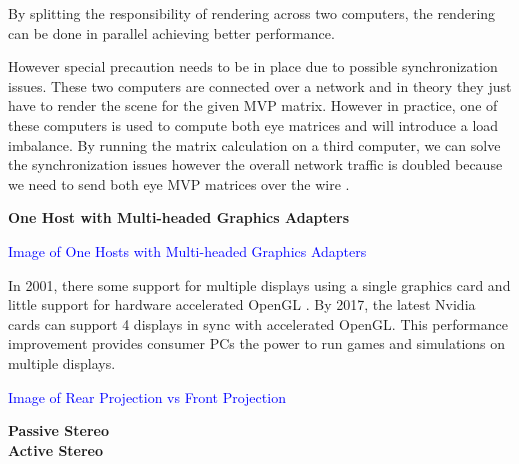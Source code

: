 By splitting the responsibility of rendering across two computers, the rendering can be done in parallel achieving better performance. 

However special precaution needs to be in place due to possible synchronization issues. These two computers are connected over a network and in theory they just have to render the scene for the given MVP matrix. However in practice, one of these computers is used to compute both eye matrices and will introduce a load imbalance. By running the matrix calculation on a third computer, we can solve the synchronization issues however the overall network traffic is doubled because we need to send both eye MVP matrices over the wire \cite{belleman}.

\filbreak
\noindent\textbf{One Host with Multi-headed Graphics Adapters}\\
\begin{center}
	\textcolor{blue}{Image of One Hosts with Multi-headed Graphics Adapters}
\end{center}

In 2001, there some support for multiple displays using a single graphics card and little support for hardware accelerated OpenGL \cite{belleman}.  By 2017, the latest Nvidia cards can support 4 displays in sync with accelerated OpenGL. This performance improvement provides consumer PCs the power to run games and simulations on multiple displays.


\filbreak
{}
\begin{center}
	\textcolor{blue}{Image of Rear Projection vs Front Projection}
\end{center}


\filbreak
{}

\filbreak
\noindent\textbf{Passive Stereo}\\

\filbreak
\noindent\textbf{Active Stereo}\\

\filbreak
{}

\clearpage
